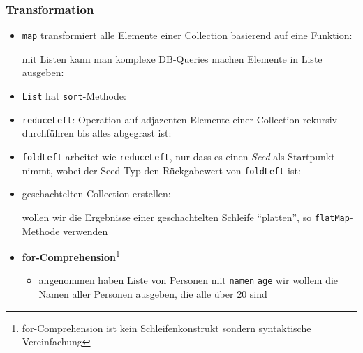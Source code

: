 \subsubsection{Transformation}
\begin{itemize}
  \item \texttt{map} transformiert alle Elemente einer Collection
  basierend auf eine Funktion:
  
  
  
  
  mit Listen kann man komplexe DB-Queries machen
  \und Elemente in Liste ausgeben:
  
  
  
  \item \texttt{List} hat \texttt{sort}-Methode:
  
  
  
  \item \texttt{reduceLeft}: Operation auf adjazenten Elemente einer
  Collection rekursiv durchführen bis alles abgegrast ist:
  
  
  
  \item \texttt{foldLeft} arbeitet wie \texttt{reduceLeft}, nur dass es 
  einen \textit{Seed} als Startpunkt nimmt, wobei der Seed-Typ den Rückgabewert von \texttt{foldLeft} ist:
  
  
  
  \item geschachtelten Collection erstellen:
  
  
  
  wollen wir die Ergebnisse einer geschachtelten Schleife 
  \enquote{platten}, so \texttt{flatMap}-Methode verwenden
  
  \item \textbf{for-Comprehension}\footnote{for-Comprehension ist 
  kein Schleifenkonstrukt sondern syntaktische Vereinfachung}
  \begin{itemize}
    \item angenommen haben Liste von Personen mit \texttt{namen} \und 
    \texttt{age} \und wir wollem die Namen aller Personen ausgeben, die
    alle über 20 sind
    
    
    

\end{itemize}
\end{itemize}
